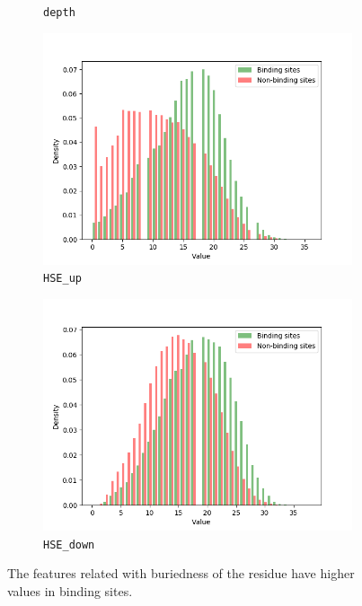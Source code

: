\begin{figure}[!htbp]
\begin{subfigure}{.5\textwidth}
  \caption{\texttt{depth}}
\end{subfigure}
\begin{subfigure}{.5\textwidth}
  \centering
  \includegraphics[width=1\linewidth]{../img/HSE_up_hist.png}
  \caption{\texttt{HSE\_up}}
\end{subfigure}%
\begin{subfigure}{.5\textwidth}
  \centering
  \includegraphics[width=1\linewidth]{../img/HSE_down_hist.png}
  \caption{\texttt{HSE\_down}}
\end{subfigure}
\caption{The features related with buriedness of the residue have higher values in binding sites.}
\label{fig:buriedness}
\end{figure}

